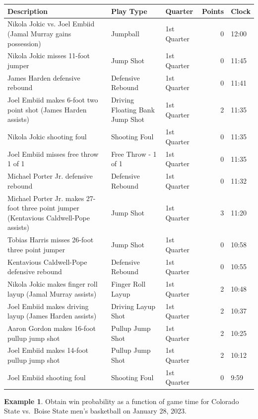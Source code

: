 \documentclass[
  11pt,
]{book}
\theoremstyle{definition}
\theoremstyle{definition}
\newtheorem{example}{Example}[chapter]
\theoremstyle{definition}
\theoremstyle{definition}
\theoremstyle{remark}
\begin{document}
\begin{tabular}{>{\raggedright\arraybackslash}p{3in}>{\raggedright\arraybackslash}p{1in}lrl}
\toprule
Description & Play Type & Quarter & Points & Clock\\
\midrule
Nikola Jokic vs. Joel Embiid (Jamal Murray gains possession) & Jumpball & 1st Quarter & 0 & 12:00\\
Nikola Jokic misses 11-foot jumper & Jump Shot & 1st Quarter & 0 & 11:45\\
James Harden defensive rebound & Defensive Rebound & 1st Quarter & 0 & 11:41\\
Joel Embiid makes 6-foot two point shot (James Harden assists) & Driving Floating Bank Jump Shot & 1st Quarter & 2 & 11:35\\
Nikola Jokic shooting foul & Shooting Foul & 1st Quarter & 0 & 11:35\\
\addlinespace
Joel Embiid misses free throw 1 of 1 & Free Throw - 1 of 1 & 1st Quarter & 0 & 11:35\\
Michael Porter Jr. defensive rebound & Defensive Rebound & 1st Quarter & 0 & 11:32\\
Michael Porter Jr. makes 27-foot three point jumper (Kentavious Caldwell-Pope assists) & Jump Shot & 1st Quarter & 3 & 11:20\\
Tobias Harris misses 26-foot three point jumper & Jump Shot & 1st Quarter & 0 & 10:58\\
Kentavious Caldwell-Pope defensive rebound & Defensive Rebound & 1st Quarter & 0 & 10:55\\
\addlinespace
Nikola Jokic makes finger roll layup (Jamal Murray assists) & Finger Roll Layup & 1st Quarter & 2 & 10:48\\
Joel Embiid makes driving layup (James Harden assists) & Driving Layup Shot & 1st Quarter & 2 & 10:37\\
Aaron Gordon makes 16-foot pullup jump shot & Pullup Jump Shot & 1st Quarter & 2 & 10:25\\
Joel Embiid makes 14-foot pullup jump shot & Pullup Jump Shot & 1st Quarter & 2 & 10:12\\
Joel Embiid shooting foul & Shooting Foul & 1st Quarter & 0 & 9:59\\
\bottomrule
\end{tabular}

\newpage

\begin{example}
Obtain win probability as a function of game time for Colorado State vs.~Boise State men's basketball on January 28, 2023.
\end{example}
\end{document}
